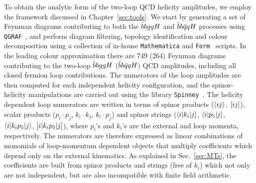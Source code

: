 \documentclass[main.tex]{subfiles}
\begin{document}
To obtain the analytic form of the two-loop QCD helicity amplitudes, we employ the framework discussed in Chapter~\ref{sec:tools}. We start by generating a set of Feynman diagrams contributing to 
both the $\bar{b}bggH$ and $\bar{b}b\bar{q}qH$ processes using \texttt{QGRAF}~\cite{Nogueira:1991ex}, and perform diagram filtering, topology identification and colour decomposition using a collection of in-house \texttt{Mathematica} and \texttt{Form}~\cite{Kuipers:2012rf,Ruijl:2017dtg} scripts.  In the leading colour approximation there are 749 (264) Feynman diagrams contributing to the two-loop $\bar{b}bggH$ ($\bar{b}b\bar{q}qH$) QCD amplitudes, including all closed fermion loop contributions. The numerators of the loop amplitudes are then computed for each independent helicity configuration, and the spinor-helicity manipulations are carried out using the library \texttt{Spinney}~\cite{Cullen:2010jv}. The helicity dependent loop numerators are written in terms of spinor products ($\langle ij\rangle$, $[ij]$), scalar products ($p_i\cdot p_j$, $k_i\cdot k_j$, $k_i \cdot p_j$) and spinor strings ($\langle i|k_i|j]$, $\langle i|p_5|j]$, $\langle i|k_i p_5|j\rangle$, $[i|k_i p_5|j]$), where $p_i$'s and $k_i$'s are the external and loop momenta, respectively. The numerators are therefore expressed as linear combinations of monomials of loop-momentum dependent objects that multiply coefficients which depend only on the external kinematics.
As explained in Sec.~\ref{sec:MTs}, the coefficients are built from spinor products and strings (free of $k_i$) which not only are not independent, but are also incompatible with finite field arithmetic.
\end{document}

